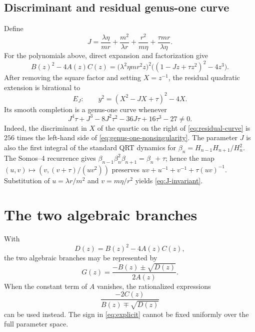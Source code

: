 \documentclass[11pt]{article}
\theoremstyle{remark}
\begin{document}
\subsection{Discriminant and residual genus-one curve}
Define
\begin{equation}
 J=\frac{\lambda\eta}{mr}+\frac{m^2}{\lambda r}
   +\frac{r^2}{m\eta}+\frac{\tau mr}{\lambda\eta}.
 \label{eq:J-invariant}
\end{equation}
For the polynomials above, direct expansion and factorization give
\begin{equation}
 B(z)^2-4A(z)C(z)=\bigl(\lambda^2\eta m r^2 z\bigr)^2
 \bigl((1-Jz+\tau z^2)^2-4z^3\bigr).
 \label{eq:discriminant-factorization}
\end{equation}
After removing the square factor and setting $X=z^{-1}$, the residual
quadratic extension is birational to
\begin{equation}
 E_J:\qquad y^2=(X^2-JX+\tau)^2-4X.
 \label{eq:residual-curve}
\end{equation}
Its smooth completion is a genus-one curve whenever
\begin{equation}
 J^4\tau+J^3-8J^2\tau^2-36J\tau+16\tau^3-27\ne0.
 \label{eq:genus-one-nonsingularity}
\end{equation}
Indeed, the discriminant in $X$ of the quartic on the right of
\eqref{eq:residual-curve} is $256$ times the left-hand side of
\eqref{eq:genus-one-nonsingularity}.  The parameter $J$ is also the first
integral of the standard QRT dynamics for
$\beta_n=H_{n-1}H_{n+1}/H_n^2$.  The Somos--4 recurrence gives
$\beta_{n-1}\beta_n^2\beta_{n+1}=\beta_n+\tau$; hence the map
$(u,v)\mapsto(v,(v+\tau)/(uv^2))$ preserves
$uv+u^{-1}+v^{-1}+\tau(uv)^{-1}$.  Substitution of
$u=\lambda r/m^2$ and $v=m\eta/r^2$ yields \eqref{eq:J-invariant}.




\section{The two algebraic branches}

With
\[
 D(z)=B(z)^2-4A(z)C(z),
\]
the two algebraic branches may be represented by
\begin{equation}
 G(z)=\frac{-B(z)\mathbin{\pm}\sqrt{D(z)}}{2A(z)}.
 \label{eq:explicit}
\end{equation}
When the constant term of $A$ vanishes, the rationalized expressions
\[
 \frac{-2C(z)}{B(z)\mp\sqrt{D(z)}}
\]
can be used instead.  The sign in \eqref{eq:explicit} cannot be fixed
uniformly over the full parameter space.
\end{document}
